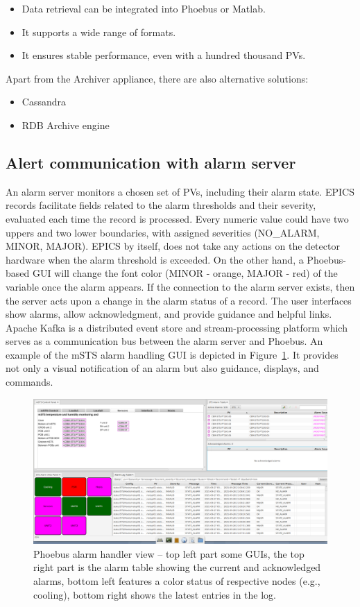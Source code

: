 \begin{itemize}
    \item Data retrieval can be integrated into Phoebus or Matlab.
    \item It supports a wide range of formats.
    \item It ensures stable performance, even with a hundred thousand \glspl{PV}.
\end{itemize}

Apart from the Archiver appliance, there are also alternative solutions:

\begin{itemize}
    \item Cassandra \cite{cassandra_archive}
    \item RDB Archive engine \cite{rdb_archive}
\end{itemize}

\subsection{Alert communication with alarm server}
An alarm server monitors a chosen set of \glspl{PV}, including their alarm state. \gls{EPICS} records facilitate fields related to the alarm thresholds and their severity, evaluated each time the record is processed. Every numeric value could have two uppers and two lower boundaries, with assigned severities (NO\_ALARM, MINOR, MAJOR). \gls{EPICS} by itself, does not take any actions on the detector hardware when the alarm threshold is exceeded. On the other hand, a Phoebus-based \gls{GUI} will change the font color (MINOR - orange, MAJOR - red) of the variable once the alarm appears. If the connection to the alarm server exists, then the server acts upon a change in the alarm status of a record. The user interfaces show alarms, allow acknowledgment, and provide guidance and helpful links. Apache Kafka is a distributed event store and stream-processing platform which serves as a communication bus between the alarm server and Phoebus. An example of the \gls{mSTS} alarm handling \gls{GUI} is depicted in Figure~\ref{fig_alarm1}. It provides not only a visual notification of an alarm but also guidance, displays, and commands.
\begin{figure}[!h]
\centering
\includegraphics[width=1\columnwidth]{Chapter4/images/alarms.png}
\caption{Phoebus alarm handler view --  top left part some \gls{GUI}s, the top right part is the alarm table showing the current and acknowledged alarms, bottom left features a color status of respective nodes (e.g., cooling), bottom right shows the latest entries in the log.}
\label{fig_alarm1}
\end{figure}
\newpage
